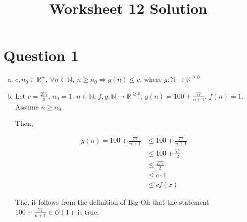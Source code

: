 \documentclass[12pt]{article}
\begin{document}
\title{Worksheet 12 Solution}
\maketitle

\section*{Question 1}
\begin{enumerate}[a.]
    \item

    $c,n_0 \in \mathbb{R}^{+},\:\forall n \in \mathbb{N},\: n \geq n_0 \Rightarrow
    g(n) \leq c$, where $g: \mathbb{N} \to \mathbb{R}^{\geq 0}$

    \item

    Let $c = \frac{277}{2}$, $n_0 = 1$, $n \in \mathbb{N}$, $f,g: \mathbb{N} \to
    \mathbb{R}^{\geq 0}$, $g(n) = 100 + \frac{77}{n+1}$, $f(n) = 1$. Assume $n \geq n_0$

    \bigskip

    Then,

    \begin{align}
        g(n) = 100 + \frac{77}{n+1} &\leq 100 + \frac{77}{n+1}\\
        &\leq 100 + \frac{77}{2}\\
        &\leq \frac{277}{2}\\
        &\leq c \cdot 1\\
        &\leq c f(x)
    \end{align}

    \bigskip

    The, it follows from the definition of Big-Oh that the statement $100 +
    \frac{77}{n+1} \in \mathcal{O}(1)$ is true.
\end{enumerate}
\end{document}
